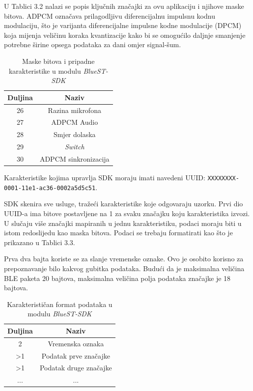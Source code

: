 U Tablici 3.2 nalazi se popis ključnih značajki za ovu aplikaciju i njihove maske bitova. ADPCM označava prilagodljivu diferencijalnu impulsnu kodnu modulaciju, što je varijanta diferencijalne impulsne kodne modulacije (DPCM) koja mijenja veličinu koraka kvantizacije kako bi se omogućilo daljnje smanjenje potrebne širine opsega podataka za dani omjer signal-šum. 

\begin{table}[ht!]
	\centering
	\caption{Maske bitova i pripadne karakteristike u modulu \textit{BlueST-SDK}}
	\begin{tabular}{|c| c|}
		\hline
		\rowcolor{lightblue}  
		\textbf{Duljina} & \textbf{Naziv}  \\ \hline
		26 & Razina mikrofona \\ \hline
		27 & ADPCM Audio \\ \hline
		28 & Smjer dolaska \\ \hline
		29 & \textit{Switch} \\ \hline
		30 & ADPCM sinkronizacija  \\ \hline
	\end{tabular}
\end{table}

Karakteristike kojima upravlja SDK moraju imati navedeni UUID:
\newline \texttt{XXXXXXXX-0001-11e1-ac36-0002a5d5c51}. 

SDK skenira sve usluge, tražeći karakteristike koje odgovaraju uzorku. Prvi dio UUID-a ima bitove postavljene na 1 za svaku značajku koju karakteristika izvozi. U slučaju više značajki mapiranih u jednu karakteristiku, podaci moraju biti u istom redoslijedu kao maska bitova. Podaci se trebaju formatirati kao što je prikazano u Tablici 3.3.

Prva dva bajta koriste se za slanje vremenske oznake. Ovo je osobito korisno za prepoznavanje bilo kakvog gubitka podataka. Budući da je maksimalna veličina BLE paketa 20 bajtova, maksimalna veličina polja podataka značajke je 18 bajtova.

\begin{table}[ht!]
	\centering
	\caption{Karakterističan format podataka u modulu \textit{BlueST-SDK}}
	\begin{tabular}{|c| c|}
		\hline
		\rowcolor{lightblue}  
		\textbf{Duljina} & \textbf{Naziv}  \\ \hline
		2 &  Vremenska oznaka \\ \hline
		>1 & Podatak prve značajke \\ \hline
		>1 & Podatak druge značajke \\ \hline
		... & ... \\ \hline
	\end{tabular}
\end{table}

